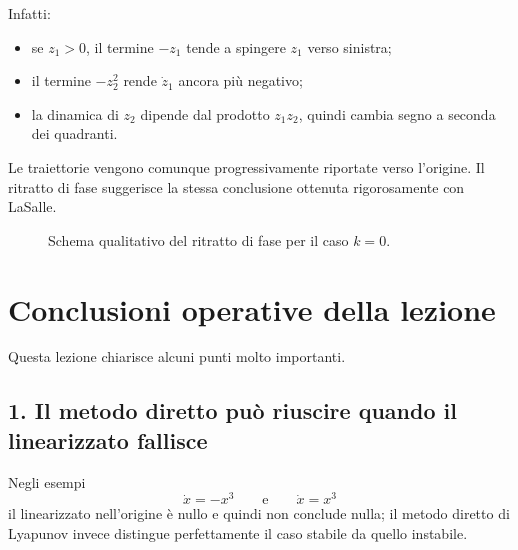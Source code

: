 Infatti:
\begin{itemize}
    \item se \(z_1>0\), il termine \(-z_1\) tende a spingere \(z_1\) verso sinistra;
    \item il termine \(-z_2^2\) rende \(\dot z_1\) ancora più negativo;
    \item la dinamica di \(z_2\) dipende dal prodotto \(z_1z_2\), quindi cambia segno a seconda dei quadranti.
\end{itemize}

Le traiettorie vengono comunque progressivamente riportate verso l'origine.  
Il ritratto di fase suggerisce la stessa conclusione ottenuta rigorosamente con LaSalle.

\begin{figure}[h!]
\centering
{}
\caption{Schema qualitativo del ritratto di fase per il caso \(k=0\).}
\end{figure}

\section{Conclusioni operative della lezione}

Questa lezione chiarisce alcuni punti molto importanti.

\subsection*{1. Il metodo diretto può riuscire quando il linearizzato fallisce}
Negli esempi
\[
\dot x=-x^3
\qquad \text{e} \qquad
\dot x=x^3
\]
il linearizzato nell'origine è nullo e quindi non conclude nulla; il metodo diretto di Lyapunov invece distingue perfettamente il caso stabile da quello instabile.

